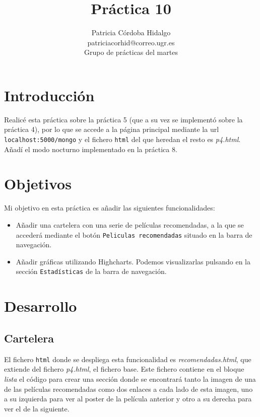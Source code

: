 \documentclass{article}
\begin{document}
\title{\Huge Práctica 10}
\author{\LARGE Patricia Córdoba Hidalgo \vspace{2mm}\\
  \Large patriciacorhid@correo.ugr.es \vspace{2mm}\\
  \Large Grupo de prácticas del  martes \vspace{5mm}}
\date{}
\maketitle

\section{Introducción}

Realicé esta práctica sobre la práctica 5 (que a su vez se implementó sobre la práctica 4), por lo que se accede a la página principal mediante la url \texttt{localhost:5000/mongo} y el fichero \texttt{html} del que heredan el resto es \textit{p4.html}. Añadí el modo nocturno implementado en la práctica 8.

\section{Objetivos}

Mi objetivo en esta práctica es añadir las siguientes funcionalidades:
\begin{itemize}
\item Añadir una cartelera con una serie de películas recomendadas, a la que se accederá mediante el botón \texttt{Peliculas recomendadas} situado en la barra de navegación.
\item Añadir gráficas utilizando Highcharts. Podemos visualizarlas pulsando en la sección \texttt{Estadísticas} de la barra de navegación.
\end{itemize}

\section{Desarrollo}

\subsection{Cartelera}

El fichero \texttt{html} donde se despliega esta funcionalidad es \textit{recomendadas.html}, que extiende del fichero \textit{p4.html}, el fichero base. Este fichero contiene en el bloque \textit{lista} el código para crear una sección donde se encontrará tanto la imagen de una de las películas recomendadas como dos enlaces a cada lado de esta imagen, uno a su izquierda para ver al poster de la película anterior y otro a su derecha para ver el de la siguiente.\\
\end{document}
